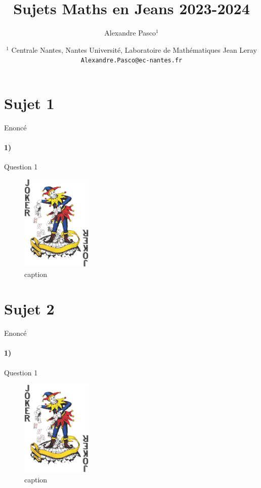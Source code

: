 \documentclass[a4paper,10pt,oneside]{article}
\title{Sujets Maths en Jeans 2023-2024}
\author{
  Alexandre Pasco${}^{1}$}
\date{\medskip%
  \small %
  ${}^1$  Centrale Nantes, Nantes Université, Laboratoire de Mathématiques Jean Leray\\
  \texttt{Alexandre.Pasco@ec-nantes.fr}
  }
\begin{document}
\maketitle


\section{Sujet 1}

Enoncé

\paragraph*{1)} Question 1
\vspace{3cm}
\begin{figure}[!ht]
  \centering
  \includegraphics[width=0.3\textwidth]{figures/traders.jpg}
  \caption*{caption}
\end{figure}



\section{Sujet 2}

Enoncé

\paragraph*{1)} Question 1
\vspace{3cm}
\begin{figure}[!ht]
  \centering
  \includegraphics[width=0.3\textwidth]{figures/traders.jpg}
  \caption*{caption}
\end{figure}



  

\end{document}
